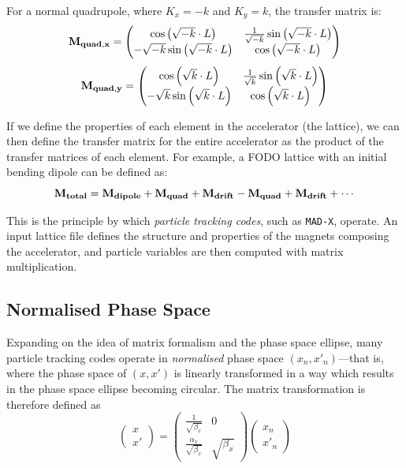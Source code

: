 \documentclass[11pt]{report}
\begin{document}
For a normal quadrupole, where $K_x=-k$ and $K_y=k$, the transfer matrix is:
\begin{equation}
  \bf{M}_{quad,x}=
  \begin{pmatrix}
    \cos\left(\sqrt{-k}\cdot L\right) & \frac1{\sqrt{-k}}\sin\left(\sqrt{-k}\cdot L\right) \\
    -\sqrt{-k}\sin\left(\sqrt{-k}\cdot L\right) & \cos\left(\sqrt{-k}\cdot L\right)
  \end{pmatrix}
\end{equation}
\begin{equation}
  \bf{M}_{quad,y}=
  \begin{pmatrix}
    \cos\left(\sqrt{k}\cdot L\right) & \frac1{\sqrt{k}}\sin\left(\sqrt{k}\cdot L\right) \\
    -\sqrt{k}\sin\left(\sqrt{k}\cdot L\right) & \cos\left(\sqrt{k}\cdot L\right)
  \end{pmatrix}
\end{equation}

If we define the properties of each element in the accelerator (the lattice), we can then define the transfer matrix for the entire accelerator as the product of the transfer matrices of each element. For example, a FODO lattice with an initial bending dipole can be defined as:
\begin{equation}
  \bf{M}_{total} = \bf{M}_{dipole} + \bf{M}_{quad} + \bf{M}_{drift} - \bf{M}_{quad} + \bf{M}_{drift} +\cdots
\end{equation}

This is the principle by which \textit{particle tracking codes}, such as \verb|MAD-X|, operate. An input lattice file defines the structure and properties of the magnets composing the accelerator, and particle variables are then computed with matrix multiplication. 

\subsection{Normalised Phase Space}

Expanding on the idea of matrix formalism and the phase space ellipse, many particle tracking codes operate in \textit{normalised} phase space $(x_n, x'_n)$---that is, where the phase space of $(x, x')$ is linearly transformed in a way which results in the phase space ellipse becoming circular. The matrix transformation is therefore defined as
\begin{equation}
  \begin{pmatrix}
    x \\
    x'
  \end{pmatrix} = 
  \begin{pmatrix}
    \frac{1}{\sqrt{\beta_x}} & 0 \\
    \frac{\alpha_x}{\sqrt{\beta_x}} & \sqrt{\beta_x}
  \end{pmatrix} \begin{pmatrix}
    x_n \\
    x'_n
  \end{pmatrix}
\end{equation}
\end{document}
